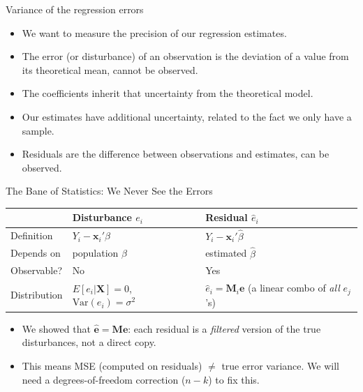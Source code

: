 \documentclass[aspectratio=169, handout]{beamer}
\numberwithin{equation}{section}
\begin{document}
\begin{frame}{Variance of the regression errors}
\begin{itemize}
\item We want to measure the precision of our regression estimates.
\item The error (or disturbance) of an observation is the deviation of a value from its theoretical mean, cannot be observed.
\item The coefficients inherit that uncertainty from the theoretical model.
\item Our estimates have additional uncertainty, related to the fact we only have a sample.
\item Residuals are the difference between observations and estimates, can be observed.
\end{itemize}
\end{frame}


\begin{frame}{The Bane of Statistics: We Never See the Errors}
\begin{center}
\begin{tabular}{l@{\hskip 2em}l@{\hskip 2em}l}
& \textbf{Disturbance $e_i$} & \textbf{Residual $\hat{e}_i$}\\
\hline
Definition & $Y_i - \bm{x}_i'\beta$ & $Y_i - \bm{x}_i'\hat{\beta}$\\[4pt]
Depends on & population $\beta$ & estimated $\hat{\beta}$\\[4pt]
Observable? & \alert{No} & Yes\\[4pt]
Distribution & $E[e_i|\bm{X}]=0$,\ $\text{Var}(e_i)=\sigma^2$ & $\hat{e}_i = \bm{M}_i\bm{e}$ (a linear combo of \emph{all} $e_j$'s)\\
\end{tabular}
\end{center}
\vspace{0.5em}
\begin{itemize}
\item We showed that $\bm{\hat{e}}=\bm{Me}$: each residual is a \emph{filtered} version of the true disturbances, not a direct copy.\pause
\item This means MSE (computed on residuals) $\neq$ true error variance. We will need a degrees-of-freedom correction ($n-k$) to fix this.
\end{itemize}
\end{frame}
\end{document}
